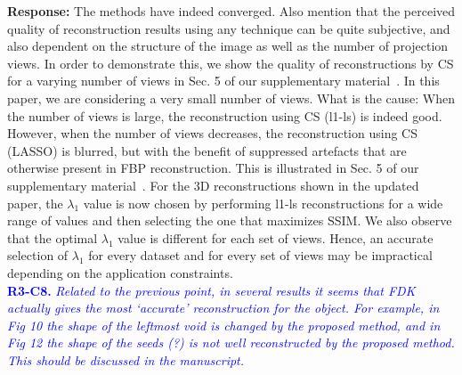 \documentclass{article}
\begin{document}
\textbf{Response:} The methods have indeed converged. Also mention that the perceived quality of reconstruction results using any technique can be quite subjective, and also dependent on the structure of the image as well as the number of projection views. In order to demonstrate this, we show the quality of reconstructions by CS for a varying number of views in Sec. 5 of our supplementary material~\cite{supp_paper}. In this paper, we are considering a very small number of views.  
What is the cause: When the number of views is large, the reconstruction using CS (l1-ls) is indeed good. However, when the number of views decreases, the reconstruction using CS (LASSO) is blurred, but with the benefit of suppressed artefacts that are otherwise present in FBP reconstruction. This is illustrated in Sec. 5 of our supplementary material~\cite{supp_paper}.      
For the 3D reconstructions shown in the updated paper, the $\lambda_1$ value is now chosen by performing l1-ls reconstructions for a wide range of values and then selecting the one that maximizes SSIM.
We also observe that the optimal $\lambda_1$ value is different for each set of views. Hence, an accurate selection of $\lambda_1$ for every dataset and for every set of views may be impractical depending on the application constraints.\\

\textcolor{blue}{\textbf{R3-C8.}\textit{ Related to the previous point, in several results it seems that FDK actually gives the most `accurate' reconstruction for the object. For example, in Fig 10 the shape of the leftmost void is changed by the proposed method, and in Fig 12 the shape of the seeds (?) is not well reconstructed by the proposed method. This should be discussed in the manuscript.}}
    
\end{document}
